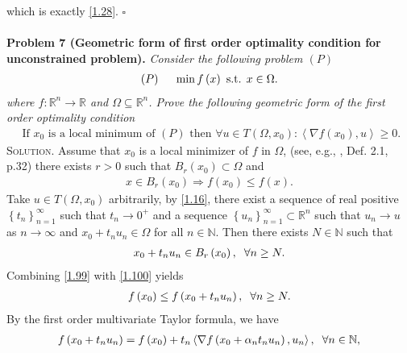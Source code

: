 \documentclass[a4paper]{article}
\numberwithin{equation}{section}
\begin{document}
which is exactly \eqref{1.28}. \hfill $\square$\\
\\
\textbf{Problem 7 (Geometric form of first order optimality condition for unconstrained problem).} \textit{Consider the following problem $\left(P\right)$}
\begin{align}
\left( P \right)\hspace{0.5cm}\min f\left( x \right)\mbox{ s.t. } x \in \Omega .
\end{align}
\textit{where $f:\mathbb{R}^n\to \mathbb{R}$ and $\Omega  \subseteq {\mathbb{R}^n}$. Prove the following geometric form of the first order optimality condition}
\begin{align}
\label{1.98}
\mbox{ If } {x_0}\mbox{ is a local minimum of }\left( P \right) \mbox{ then } \forall u \in T\left( {\Omega ,{x_0}} \right):\left\langle {\nabla f\left( {{x_0}} \right),u} \right\rangle  \ge 0.
\end{align}
\textsc{Solution.} Assume that $x_0$ is a local minimizer of $f$ in $\Omega$, (see, e.g., \cite{1}, Def. 2.1, p.32) there exists $r>0$ such that ${B_r}\left( {{x_0}} \right) \subset \Omega $ and 
\begin{align}
\label{1.99}
x \in {B_r}\left( {{x_0}} \right) \Rightarrow f\left( {{x_0}} \right) \le f\left( x \right).
\end{align}
Take $u\in T\left(\Omega,x_0\right)$ arbitrarily, by \eqref{1.16}, there exist a sequence of real positive $\left\{ {{t_n}} \right\}_{n = 1}^\infty $ such that $t_n \to 0^+$ and a sequence $\left\{ {{u_n}} \right\}_{n = 1}^\infty  \subset {\mathbb{R}^n}$ such that $u_n\to u$ as $n\to \infty$ and $x_0+t_nu_n\in \Omega$ for all $n\in \mathbb{N}$. Then there exists $N\in \mathbb{N}$ such that 
\begin{align}
\label{1.100}
{x_0} + {t_n}{u_n} \in {B_r}\left( {{x_0}} \right),\hspace{0.2cm}\forall n \ge N.
\end{align}
Combining \eqref{1.99} with \eqref{1.100} yields
\begin{align}
\label{1.101}
f\left( {{x_0}} \right) \le f\left( {{x_0} + {t_n}{u_n}} \right),\hspace{0.2cm}\forall n \ge N.
\end{align}
By the first order multivariate Taylor formula, we have
\begin{align}
\label{1.102}
f\left( {{x_0} + {t_n}{u_n}} \right) = f\left( {{x_0}} \right) + {t_n}\left\langle {\nabla f\left( {{x_0} + {\alpha _n}{t_n}{u_n}} \right),{u_n}} \right\rangle ,\hspace{0.2cm}\forall n \in \mathbb{N},
\end{align}
\end{document}
